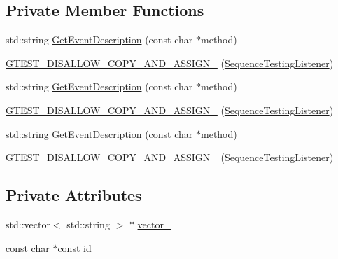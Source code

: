 \subsection*{Private Member Functions}
\begin{DoxyCompactItemize}
\item 
std\+::string \mbox{\hyperlink{class_sequence_testing_listener_adc3ddea0d1af961470237ed96433e945}{Get\+Event\+Description}} (const char $\ast$method)
\item 
\mbox{\hyperlink{class_sequence_testing_listener_a56de089e40314ad71db2ec3a56a87699}{G\+T\+E\+S\+T\+\_\+\+D\+I\+S\+A\+L\+L\+O\+W\+\_\+\+C\+O\+P\+Y\+\_\+\+A\+N\+D\+\_\+\+A\+S\+S\+I\+G\+N\+\_\+}} (\mbox{\hyperlink{class_sequence_testing_listener}{Sequence\+Testing\+Listener}})
\item 
std\+::string \mbox{\hyperlink{class_sequence_testing_listener_adc3ddea0d1af961470237ed96433e945}{Get\+Event\+Description}} (const char $\ast$method)
\item 
\mbox{\hyperlink{class_sequence_testing_listener_a56de089e40314ad71db2ec3a56a87699}{G\+T\+E\+S\+T\+\_\+\+D\+I\+S\+A\+L\+L\+O\+W\+\_\+\+C\+O\+P\+Y\+\_\+\+A\+N\+D\+\_\+\+A\+S\+S\+I\+G\+N\+\_\+}} (\mbox{\hyperlink{class_sequence_testing_listener}{Sequence\+Testing\+Listener}})
\item 
std\+::string \mbox{\hyperlink{class_sequence_testing_listener_adc3ddea0d1af961470237ed96433e945}{Get\+Event\+Description}} (const char $\ast$method)
\item 
\mbox{\hyperlink{class_sequence_testing_listener_a56de089e40314ad71db2ec3a56a87699}{G\+T\+E\+S\+T\+\_\+\+D\+I\+S\+A\+L\+L\+O\+W\+\_\+\+C\+O\+P\+Y\+\_\+\+A\+N\+D\+\_\+\+A\+S\+S\+I\+G\+N\+\_\+}} (\mbox{\hyperlink{class_sequence_testing_listener}{Sequence\+Testing\+Listener}})
\end{DoxyCompactItemize}
\subsection*{Private Attributes}
\begin{DoxyCompactItemize}
\item 
std\+::vector$<$ std\+::string $>$ $\ast$ \mbox{\hyperlink{class_sequence_testing_listener_ad5dfd0f0de44d9444803201f3e22fc98}{vector\+\_\+}}
\item 
const char $\ast$const \mbox{\hyperlink{class_sequence_testing_listener_aec447cbd7cc4654b1bdbd75abcbc138f}{id\+\_\+}}
\end{DoxyCompactItemize}


